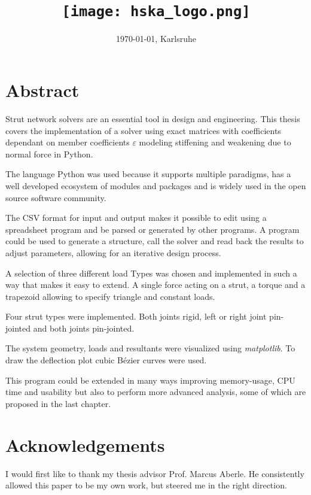 \documentclass[12pt, oneside]{report}
\title{
	{\GetTitle{}}\\
	{\texttt{[image: hska\_logo.png]}}
}
\author{\GetAuthor{}}
\date{\today{}, Karlsruhe}
\begin{document}
\newpage
\listoftodos[Notes]
\newpage

\maketitle
\setcounter{page}{1}

\chapter*{\centering Abstract}
Strut network solvers are an essential tool in design and engineering. This thesis covers the implementation of a solver using exact matrices with coefficients dependant on member coefficients $\varepsilon$ modeling stiffening and weakening due to normal force in Python.

The language Python was used because it supports multiple paradigms, has a well developed ecosystem of modules and packages and is widely used in the open source software community.

The CSV format for input and output makes it possible to edit using a spreadsheet program and be parsed or generated by other programs.
A program could be used to generate a structure, call the solver and read back the results to adjust parameters, allowing for an iterative design process.

A selection of three different load Types was chosen and implemented in such a way that makes it easy to extend. A single force acting on a strut, a torque and a trapezoid allowing to specify triangle and constant loads.

Four strut types were implemented. Both joints rigid, left or right joint pin-jointed and both joints pin-jointed.

The system geometry, loads and resultants were visualized using \textit{matplotlib}. To draw the deflection plot cubic B\'{e}zier curves were used.

This program could be extended in many ways improving memory-usage, CPU time and usability but also to perform more advanced analysis, some of which are proposed in the last chapter.

\chapter*{\centering Acknowledgements}

I would first like to thank my thesis advisor Prof. Marcus Aberle. He consistently allowed this paper to be my own work, but steered me in the right direction.
\end{document}
